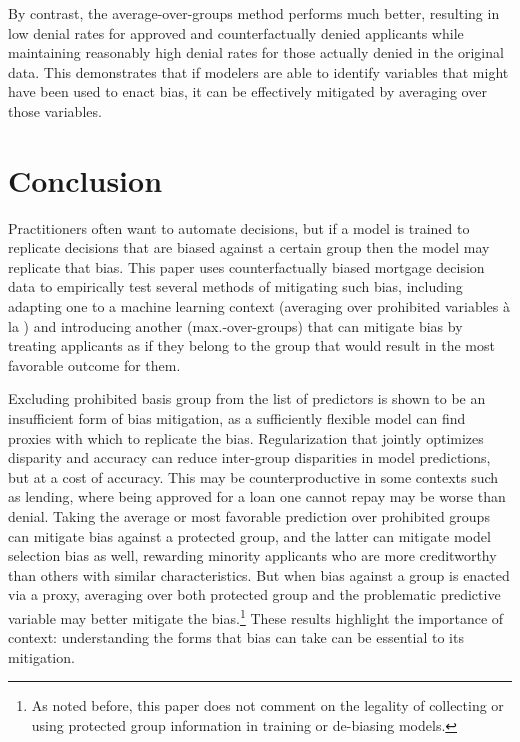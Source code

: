 By contrast, the average-over-groups method performs much better, resulting in low denial rates for approved and counterfactually denied applicants while maintaining reasonably high denial rates for those actually denied in the original data. This demonstrates that if modelers are able to identify variables that might have been used to enact bias, it can be effectively mitigated by averaging over those variables.


 
\section{Conclusion}

Practitioners often want to automate decisions, but if a model is trained to replicate decisions that are biased against a certain group then the model may replicate that bias. This paper uses counterfactually biased mortgage decision data to empirically test several methods of mitigating such bias, including adapting one to a machine learning context (averaging over prohibited variables \`a la ) and introducing another (max.-over-groups) that can mitigate bias by treating applicants as if they belong to the group that would result in the most favorable outcome for them. 

Excluding prohibited basis group from the list of predictors is shown to be an insufficient form of bias mitigation, as a sufficiently flexible model can find proxies with which to replicate the bias. Regularization that jointly optimizes disparity and accuracy can reduce inter-group disparities in model predictions, but at a cost of accuracy. This may be counterproductive in some contexts such as lending, where being approved for a loan one cannot repay may be worse than denial. Taking the average or most favorable prediction over prohibited groups can mitigate bias against a protected group, and the latter can mitigate model selection bias as well, rewarding minority applicants who are more creditworthy than others with similar characteristics. But when bias against a group is enacted via a proxy, averaging over both protected group and the problematic predictive variable may better mitigate the bias.\footnote{As noted before, this paper does not comment on the legality of collecting or using protected group information in training or de-biasing models.} These results highlight the importance of context: understanding the forms that bias can take can be essential to its mitigation.



